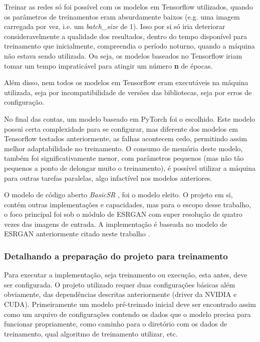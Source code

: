 Treinar as redes só foi possível com os modelos em Tensorflow utilizados, quando os parâmetros de treinamentos eram absurdamente baixos (e.g. uma imagem carregada por vez, i.e. um \textit{batch\_size} de 1). Isso por si só iria deteriorar consideravelmente a qualidade dos resultados, dentro do tempo disponível para treinamento que inicialmente, compreendia o período noturno, quando a máquina não estava sendo utilizada. Ou seja, os modelos baseados no Tensorflow iriam tomar um tempo impraticável para atingir um número \textbf{n} de épocas.

Além disso, nem todos os modelos em Tensorflow eram executáveis na máquina utilizada, seja por incompatibilidade de versões das bibliotecas, seja por erros de configuração. 

No final das contas, um modelo baseado em PyTorch foi o escolhido. Este modelo possui certa complexidade para se configurar, mas diferente dos modelos em Tensorflow testados anteriormente, as falhas acontecem cedo, permitindo assim melhor adaptabilidade no treinamento. O consumo de memória deste modelo, também foi significativamente menor, com parâmetros pequenos (mas não tão pequenos a ponto de delongar muito o treinamento), é possível utilizar a máquina para outras tarefas paralelas, algo infactível nos modelos anteriores. 

O modelo de código aberto \textit{BasicSR} \cite{blueamulet_blueamuletbasicsr_2023}, foi o modelo eleito. O projeto em si, contém outras implementações e capacidades, mas para o escopo desse trabalho, o foco principal foi sob o módulo de ESRGAN com super resolução de quatro vezes das imagens de entrada. A implementação é baseada no modelo de ESRGAN anteriormente citado neste trabalho \cite{wang_esrgan_2018}.


\subsubsection{Detalhando a preparação do projeto para treinamento}
\label{sec:preping-project-for-training}

Para executar a implementação, seja treinamento ou execução, esta antes, deve ser configurada. O projeto utilizado requer duas configurações básicas além obviamente, das dependências descritas anteriormente (driver da NVIDIA e CUDA). Primeiramente um modelo pré-treinado inicial deve ser encontrado assim como um arquivo de configurações contendo os dados que o modelo precisa para funcionar propriamente, como caminho para o diretório com os dados de treinamento, qual algoritmo de treinamento utilizar, etc.

